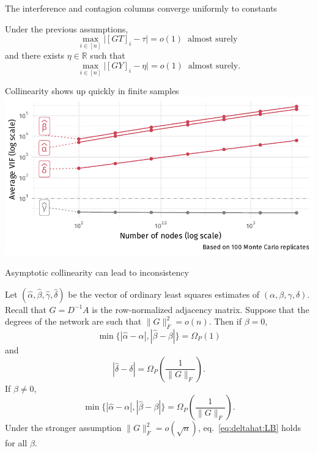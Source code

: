 \documentclass[aspectratio=169]{beamer}
\newcommand{\alphahat}{\hat{\alpha}}
\newcommand{\betahat}{\hat{\beta}}
\newcommand{\deltahat}{\hat{\delta}}
\newcommand \Omegap [1] {\Omega_P \left(#1\right)}
\newcommand{\gammahat}{\hat{\gamma}}
\newcommand{\R}{\mathbb{R}}
\theoremstyle{remark}
\begin{document}
\begin{frame}{The interference and contagion columns converge uniformly to constants}
    
    \begin{lemma}
        Under the previous assumptions,
        \begin{equation*}
            \max_{i \in [n]} \Big| [GT]_i - \tau \Big|
            = o(1) ~ \text{ almost surely }
        \end{equation*}
        and there exists $\eta \in \R$ such that
        \begin{equation*}
            \max_{i \in [n]} \Big| [GY]_i - \eta \Big|
            = o(1) ~ \text{ almost surely.}
        \end{equation*}
    \end{lemma}
\end{frame}

\begin{frame}{Collinearity shows up quickly in finite samples}
    \vspace{3mm}
    \centering
    \includegraphics{./figures/simulations/defense-vif.pdf}
\end{frame}

\begin{frame}{Asymptotic collinearity can lead to inconsistency}
    \begin{theorem}
        Let $(\alphahat, \betahat, \gammahat, \deltahat)$ be the vector of ordinary least squares estimates of $(\alpha, \beta, \gamma, \delta)$. Recall that $G = D^{-1} A$ is the row-normalized adjacency matrix. Suppose that the degrees of the network are such that $\| G \|_F^2 = o(n)$.
        Then if $\beta = 0$,
        \begin{equation*}
            \min\{ |\alphahat-\alpha|, |\betahat-\beta| \}
            = \Omegap{ 1 }
        \end{equation*}
        and
        \begin{equation} \label{eq:deltahat:LB}
            | \deltahat - \delta | = \Omegap{ \frac{1}{\|G\|_F} }.
        \end{equation}
        If $\beta \neq 0$,
        \begin{equation*}
            \min\{ |\alphahat-\alpha|, |\betahat-\beta| \}
            = \Omegap{ \frac{1}{\|G\|_F} }.
        \end{equation*}
        Under the stronger assumption $\|G\|_F^2 = o( \sqrt{n} )$, eq.~\eqref{eq:deltahat:LB} holds for all $\beta$.
    \end{theorem}
\end{frame}
\end{document}

